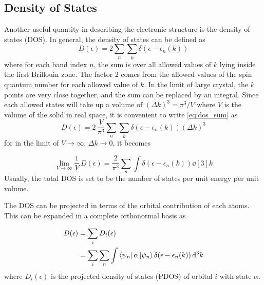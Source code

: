     \subsection{Density of States}
    Another useful quantity in describing the electronic structure is the density of states (DOS). In general, the density of states can be defined as \citep{Ashcroft1976}
    \begin{equation} \label{eq:dos_sum}
        D(\epsilon) = 2 \sum_n \sum_k \delta(\epsilon - \epsilon_n(k))
    \end{equation}
    where for each band index $n$, the sum is over all allowed values of $k$ lying inside the first Brillouin zone. The factor 2 comes from the allowed values of the spin quantum number for each allowed value of $k$. In the limit of large crystal, the $k$ points are very close together, and the sum can be replaced by an integral. Since each allowed states will take up a volume of $ (\Delta k)^3 = \pi^3/V$ where $V$ is the volume of the solid in real space, it is convenient to write \eqref{eq:dos_sum} as 
    \begin{equation} \label{eq:dos_int}
        D(\epsilon) = 2\, \frac{V}{\pi^3} \sum_n \sum_k \delta(\epsilon - \epsilon_n(k)) (\Delta k)^3
    \end{equation}
    for  in the limit of $V \rightarrow \infty $, $\Delta k \rightarrow 0$, it becomes

    \begin{equation}
        \lim_{V \to \infty} \frac{1}{V}\, D(\epsilon) = \frac{2}{\pi^3} \sum_n \int \delta(\epsilon - \epsilon_n(k)) \dd[3]{k}
    \end{equation}  
    Usually, the total DOS is set to be the number of states per unit energy per unit volume. 

    The DOS can be projected in terms of the orbital contribution of each atoms. This can be expanded in a complete orthonormal basis as \citep{Enkovaara2010}

    \begin{align}
        D(\epsilon) &= \sum_i D_i(\epsilon) \\
        &= \sum_i \sum_n \int \bra{\psi_n} \alpha \ket{\psi_n}  \delta(\epsilon - \epsilon_n(k)) \dd[3]{k}
    \end{align}
    where $D_i(\epsilon)$ is the projected density of states (PDOS) of orbital $i$ with state $\alpha$. 
     
